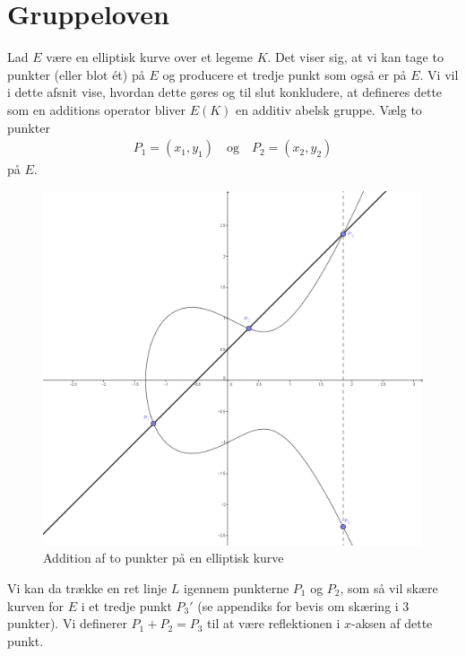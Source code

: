 \section{Gruppeloven}
Lad $E$ være en elliptisk kurve over et legeme $K$. Det viser sig, at vi kan tage to punkter (eller blot ét) på $E$ og producere et tredje punkt som også er på $E$. Vi vil i dette afsnit vise, hvordan dette gøres og til slut konkludere, at defineres dette som en additions operator bliver $E(K)$ en additiv abelsk gruppe. Vælg to punkter
\begin{align*}
	P_1 = (x_1, y_1) \quad \text{og} \quad P_2 = (x_2, y_2)
\end{align*}
på $E$. 
\begin{figure}
\label{figure_addition_law}
\centering
\includegraphics[scale=0.25]{elliptic_3}
\caption{Addition af to punkter på en elliptisk kurve}
\end{figure}
Vi kan da trække en ret linje $L$ igennem punkterne $P_1$ og $P_2$, som så vil skære kurven for $E$ i et tredje punkt ${P_3}'$ (se appendiks for bevis om skæring i 3 punkter). Vi definerer $P_1 + P_2 = P_3$ til at være reflektionen i $x$-aksen af dette punkt. 

